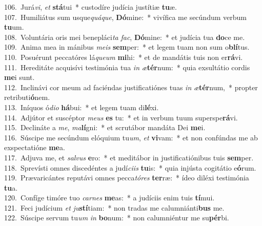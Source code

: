 {106.~}Jurá\textit{vi}, \textit{et} \textbf{stá}tui~* custodíre judícia justítiæ \textbf{tu}æ.\\
{107.~}Humiliátus sum usque\textit{quá}\textit{que}, \textbf{Dó}mine:~* vivífica me secúndum verbum \textbf{tu}um.\\
{108.~}Voluntária oris mei benepláci\textit{ta} \textit{fac}, \textbf{Dó}mine:~* et judícia tua \textbf{do}ce me.\\
{109.~}Anima mea in mánibus \textit{me}\textit{is} \textbf{sem}per:~* et legem tuam non sum o\textbf{blí}tus.\\
{110.~}Posuérunt peccatóres lá\textit{que}\textit{um} \textbf{mi}hi:~* et de mandátis tuis non er\textbf{rá}vi.\\
{111.~}Hereditáte acquisívi testimónia tua \textit{in} \textit{æ}\textbf{tér}num:~* quia exsultátio cordis \textbf{me}i sunt.\\
{112.~}Inclinávi cor meum ad faciéndas justificatiónes tuas \textit{in} \textit{æ}\textbf{tér}num,~* propter retributi\textbf{ó}nem.\\
{113.~}Iníquos ó\textit{di}\textit{o} \textbf{há}bui:~* et legem tuam di\textbf{lé}xi.\\
{114.~}Adjútor et suscéptor \textit{me}\textit{us} \textbf{es} tu:~* et in verbum tuum superspe\textbf{rá}vi.\\
{115.~}Declináte a \textit{me}, \textit{ma}\textbf{lí}gni:~* et scrutábor mandáta Dei \textbf{me}i.\\
{116.~}Súscipe me secúndum elóquium tu\textit{um}, \textit{et} \textbf{vi}vam:~* et non confúndas me ab exspectatióne \textbf{me}a.\\
{117.~}Adjuva me, et \textit{sal}\textit{vus} \textbf{e}ro:~* et meditábor in justificatiónibus tuis \textbf{sem}per.\\
{118.~}Sprevísti omnes discedéntes a judí\textit{ci}\textit{is} \textbf{tu}is:~* quia injústa cogitátio e\textbf{ó}rum.\\
{119.~}Prævaricántes reputávi omnes pecca\textit{tó}\textit{res} \textbf{ter}ræ:~* ídeo diléxi testimónia \textbf{tu}a.\\
{120.~}Confíge timóre tuo \textit{car}\textit{nes} \textbf{me}as:~* a judíciis enim tuis \textbf{tí}mui.\\
{121.~}Feci judícium \textit{et} \textit{ju}\textbf{stí}tiam:~* non tradas me calumniánti\textbf{bus} me.\\
{122.~}Súscipe servum tu\textit{um} \textit{in} \textbf{bo}num:~* non calumniéntur me su\textbf{pér}bi.\\
